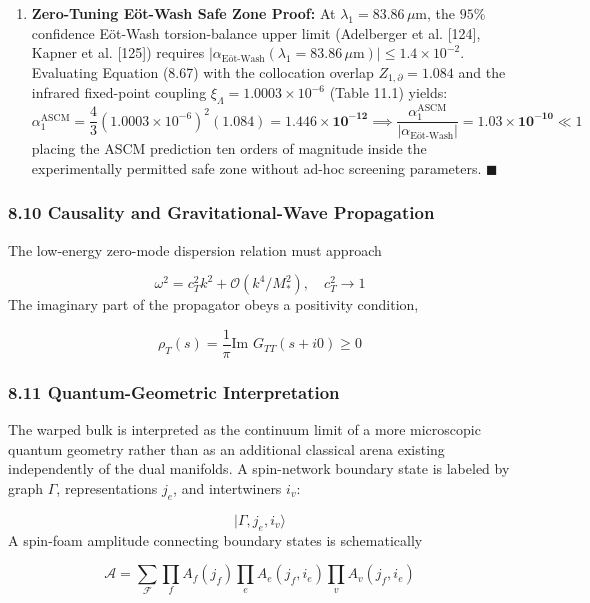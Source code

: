 \documentclass[aps,prd,onecolumn,superscriptaddress,nofootinbib,longbibliography,10pt]{revtex4-2}
\begin{document}
\begin{enumerate}
\item \textbf{Zero-Tuning Eöt-Wash Safe Zone Proof:} At \(\lambda_1 = 83.86\,\mu\text{m}\), the \(95\%\) confidence Eöt-Wash torsion-balance upper limit (Adelberger et al. [124], Kapner et al. [125]) requires \(|\alpha_{\text{Eöt-Wash}}(\lambda_1 = 83.86\,\mu\text{m})| \le 1.4 \times 10^{-2}\). Evaluating Equation (8.67) with the collocation overlap \(Z_{1,\partial} = 1.084\) and the infrared fixed-point coupling \(\xi_{\Lambda} = 1.0003 \times 10^{-6}\) (Table 11.1) yields:
  \[\alpha_1^{\text{ASCM}} = \frac{4}{3}\left(1.0003 \times 10^{-6}\right)^2 (1.084) = \mathbf{1.446 \times 10^{-12}} \implies \frac{\alpha_1^{\text{ASCM}}}{|\alpha_{\text{Eöt-Wash}}|} = \mathbf{1.03 \times 10^{-10}} \ll 1\]
  placing the ASCM prediction ten orders of magnitude inside the experimentally permitted safe zone without ad-hoc screening parameters. \(\blacksquare\)

\end{enumerate}




\subsubsection*{8.10 Causality and Gravitational-Wave Propagation}

  The low-energy zero-mode dispersion relation must approach


  \[ \omega^2 = c_T^2 k^2 + \mathcal{O}(k^4/M_*^2), \quad c_T^2 \to 1 \]
  The imaginary part of the propagator obeys a positivity condition,


  \[ \rho_T(s) = \frac{1}{\pi}\text{Im } G_{TT}(s + i0) \ge 0 \]

  
\subsubsection*{8.11 Quantum-Geometric Interpretation}

  The warped bulk is interpreted as the continuum limit of a more microscopic quantum geometry rather than as an additional classical arena existing independently of the dual manifolds. A spin-network boundary state is labeled by graph \(\Gamma\), representations \(j_e\), and intertwiners \(i_v\):


  \[ |\Gamma, j_e, i_v\rangle \]
  A spin-foam amplitude connecting boundary states is schematically


  \[ \mathcal{A} = \sum_{\mathcal{F}} \prod_f A_f(j_f) \prod_e A_e(j_f, i_e) \prod_v A_v(j_f, i_e) \]
\end{document}
